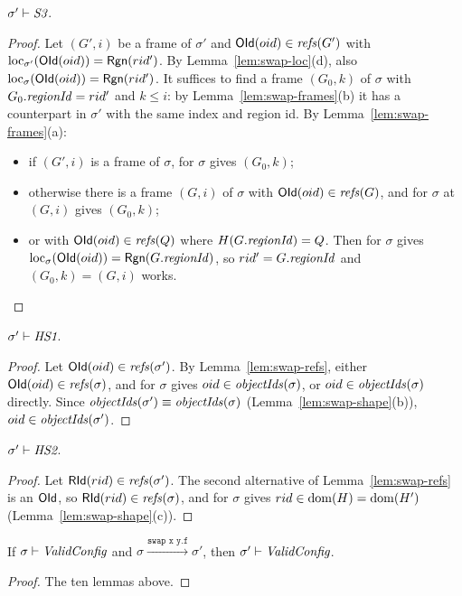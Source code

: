 \begin{lemma}[\inv{S3}] 
$\sigma' \vdash \textit{S3}$.
\end{lemma}
\begin{proof}
Let $(G', i)$ be a frame of $\sigma'$ and $\mathsf{OId}(oid) \in \mathit{refs}(G')$ with
$\mathrm{loc}_{\sigma'}(\mathsf{OId}(oid)) = \mathsf{Rgn}(rid')$. By Lemma~\ref{lem:swap-loc}(d), also
$\mathrm{loc}_{\sigma}(\mathsf{OId}(oid)) = \mathsf{Rgn}(rid')$. It suffices to find a frame $(G_0, k)$ of $\sigma$ with
$G_0.\mathit{regionId} = rid'$ and $k \le i$: by Lemma~\ref{lem:swap-frames}(b) it has a counterpart in $\sigma'$
with the same index and region id. By Lemma~\ref{lem:swap-frames}(a):
\begin{itemize}[nosep]
  \item if $(G', i)$ is a frame of $\sigma$,  for $\sigma$ gives $(G_0, k)$;
  \item otherwise there is a frame $(G, i)$ of $\sigma$ with $\mathsf{OId}(oid) \in \mathit{refs}(G)$, and 
    for $\sigma$ at $(G, i)$ gives $(G_0, k)$;
  \item or with $\mathsf{OId}(oid) \in \mathit{refs}(Q)$ where $H(G.\mathit{regionId}) = Q$. Then  for $\sigma$ gives
    $\mathrm{loc}_{\sigma}(\mathsf{OId}(oid)) = \mathsf{Rgn}(G.\mathit{regionId})$, so $rid' = G.\mathit{regionId}$ and $(G_0, k) = (G, i)$ works.
    \qedhere
\end{itemize}
\end{proof}

\begin{lemma}[\inv{HS1}] 
$\sigma' \vdash \textit{HS1}$.
\end{lemma}
\begin{proof}
Let $\mathsf{OId}(oid) \in \mathit{refs}(\sigma')$. By Lemma~\ref{lem:swap-refs}, either $\mathsf{OId}(oid) \in \mathit{refs}(\sigma)$,
and  for $\sigma$ gives $oid \in \mathit{objectIds}(\sigma)$, or $oid \in \mathit{objectIds}(\sigma)$ directly. Since
$\mathit{objectIds}(\sigma') \equiv \mathit{objectIds}(\sigma)$ (Lemma~\ref{lem:swap-shape}(b)), $oid \in \mathit{objectIds}(\sigma')$.
\end{proof}

\begin{lemma}[\inv{HS2}] 
$\sigma' \vdash \textit{HS2}$.
\end{lemma}
\begin{proof}
Let $\mathsf{RId}(rid) \in \mathit{refs}(\sigma')$. The second alternative of Lemma~\ref{lem:swap-refs} is an $\mathsf{OId}$,
so $\mathsf{RId}(rid) \in \mathit{refs}(\sigma)$, and  for $\sigma$ gives $rid \in \mathrm{dom}(H) = \mathrm{dom}(H')$
(Lemma~\ref{lem:swap-shape}(c)).
\end{proof}

\begin{theorem} 
If $\sigma \vdash \textit{ValidConfig}$ and $\sigma \xrightarrow{\texttt{swap x y.f}} \sigma'$, then
$\sigma' \vdash \textit{ValidConfig}$.
\end{theorem}
\begin{proof}
The ten lemmas above.
\end{proof}
